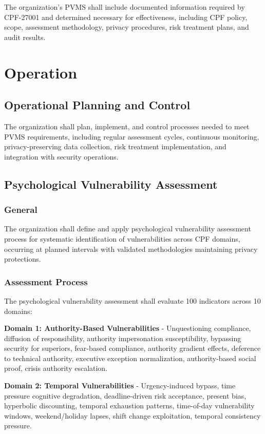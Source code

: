\documentclass[11pt,a4paper]{article}
\begin{document}
The organization's PVMS shall include documented information required by CPF-27001 and determined necessary for effectiveness, including CPF policy, scope, assessment methodology, privacy procedures, risk treatment plans, and audit results.

\section{Operation}

\subsection{Operational Planning and Control}

The organization shall plan, implement, and control processes needed to meet PVMS requirements, including regular assessment cycles, continuous monitoring, privacy-preserving data collection, risk treatment implementation, and integration with security operations.

\subsection{Psychological Vulnerability Assessment}

\subsubsection{General}

The organization shall define and apply psychological vulnerability assessment process for systematic identification of vulnerabilities across CPF domains, occurring at planned intervals with validated methodologies maintaining privacy protections.

\subsubsection{Assessment Process}

The psychological vulnerability assessment shall evaluate 100 indicators across 10 domains:

\textbf{Domain 1: Authority-Based Vulnerabilities} - Unquestioning compliance, diffusion of responsibility, authority impersonation susceptibility, bypassing security for superiors, fear-based compliance, authority gradient effects, deference to technical authority, executive exception normalization, authority-based social proof, crisis authority escalation.

\textbf{Domain 2: Temporal Vulnerabilities} - Urgency-induced bypass, time pressure cognitive degradation, deadline-driven risk acceptance, present bias, hyperbolic discounting, temporal exhaustion patterns, time-of-day vulnerability windows, weekend/holiday lapses, shift change exploitation, temporal consistency pressure.
\end{document}
